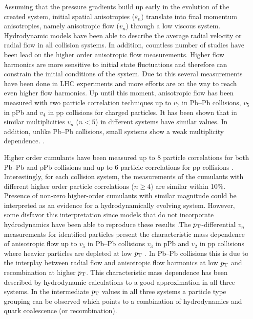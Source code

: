 \documentclass[../report.tex]{subfiles}
\begin{document}
Assuming that the pressure gradients build up early in the evolution of the created system, initial spatial anisotropies ($\varepsilon_n$) translate into final momentum anisotropies, namely anisotropic flow ($v_{n}$) through a low viscous system. Hydrodynamic models have been able to describe the average radial velocity or radial flow in all collision systems. In addition, countless number of studies have been lead on the higher order anisotropic flow measurements. Higher flow harmonics are more sensitive to initial state fluctuations and therefore can constrain the initial conditions of the system. Due to this several measurements have been done in LHC experiments and more efforts are on the way to reach even higher flow harmonics. Up until this moment, anisotropic flow has been measured with two particle correlation techniques up to $v_7$ in Pb--Pb collisions, $v_5$ in pPb and $v_4$ in pp collisions for charged particles. It has been shown that in similar multiplicities $v_n$ ($n<5$) in different systems have similar values. In addition, unlike Pb--Pb collisions, small systems show a weak multiplicity dependence. \cite{CMS:2012qk,Abelev:2012ola,Aad:2012gla,Aamodt:2011by,Chatrchyan:2011eka,Chatrchyan:2012wg,ATLAS:2012at,Aad:2014lta,Aad:2015gqa,CMS:2015zpa,Khachatryan:2016txc,Acharya:2017ino,Adam:2016ows,Adam:2016nfo,Acharya:2018zuq,Sirunyan:2017uyl,Aaboud:2017acw}.

Higher order cumulants have been measured up to 8 particle correlations for both Pb--Pb and pPb collisions and up to 6 particle correlations for pp collisions \cite{Aad:2013fja,Chatrchyan:2013nka,Khachatryan:2016txc,Aamodt:2010pa,ALICE:2011ab,Chatrchyan:2012ta,Abelev:2014mda,Chatrchyan:2013kba,Aad:2014vba,Khachatryan:2015waa,Adam:2016izf,CMS:2015ica,Sirunyan:2017pan,Sirunyan:2017igb,Aaboud:2017acw,Aaboud:2017blb}. Interestingly, for each collision system, the measurements of the cumulants with different higher order particle correlations ($n \geq 4$) are similar within 10\%. Presence of non-zero higher-order cumulants with similar magnitude could be interpreted as an evidence for a hydrodynamically evolving system. However, some disfavor this interpretation since models that do not incorporate hydrodynamics have been able to reproduce these results \cite{Sjostrand:2006za,Jia:2014pza,Gyulassy:2014cfa,McLerran:2014uka}.The $p_{\rm{T}}$-differential $v_{n}$ measurements for identified particles present the characteristic mass dependence of anisotropic flow up to $v_{5}$ in Pb--Pb collisions $v_{3}$ in pPb and $v_{2}$ in pp collisions where heavier particles are depleted at low $p_{\rm{T}}$ \cite{Abelev:2014pua,Abelev:2012di,Adam:2016nfo,Khachatryan:2014jra,ABELEV:2013wsa,CMS:2015kua,Khachatryan:2016txc,Acharya:2018zuq}. In Pb--Pb collisions this is due to the interplay between radial flow and anisotropic flow harmonics at low $p_{\rm{T}}$ and recombination at higher $p_{\rm{T}}$. This characteristic mass dependence has been described by hydrodynamic calculations to a good approximation in all three systems. In the intermediate $p_{\rm{T}}$ values in all three systems a particle type grouping can be observed which points to a combination of hydrodynamics and quark coalescence (or recombination).
\end{document}
